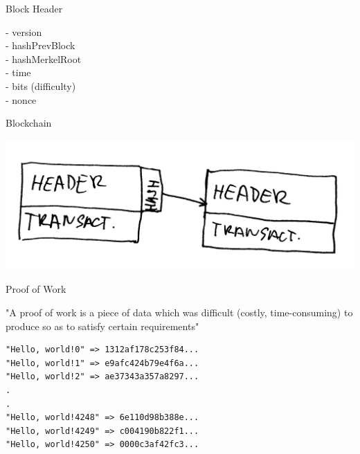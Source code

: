 \documentclass{beamer}
\begin{document}
\begin{frame}

    {\LARGE Block Header}\\

    \vspace{5mm}

    - version\\
    - hashPrevBlock\\
    - hashMerkelRoot\\
    - time\\
    - bits (difficulty)\\
    - nonce\\

\end{frame}

\begin{frame}

    {\LARGE Blockchain}\\

    \vspace{5mm}

    \includegraphics[scale=0.185]{img/blockchain}

\end{frame}


\begin{frame}[fragile]

    {\LARGE Proof of Work}\\

    \vspace{5mm}

    "A proof of work is a piece of data which was difficult (costly, time-consuming) to produce so as to satisfy certain requirements"\\

    \vspace{5mm}

    \begin{verbatim}
"Hello, world!0" => 1312af178c253f84...
"Hello, world!1" => e9afc424b79e4f6a...
"Hello, world!2" => ae37343a357a8297...
.
.
"Hello, world!4248" => 6e110d98b388e...
"Hello, world!4249" => c004190b822f1...
"Hello, world!4250" => 0000c3af42fc3...
    \end{verbatim}

\end{frame}
\end{document}
